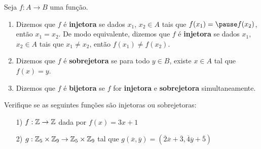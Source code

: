 \documentclass{beamer}
\begin{document}
    \begin{frame}
        \begin{definicao}
            Seja $f : A \to B$ uma fun\c{c}\~ao.\pause
            \begin{enumerate}[label={\roman*})]
                \item Dizemos que $f$ \'e \textbf{injetora} \pause se dados $x_1$, \pause $x_2 \in A$ \pause tais que $f(x_1) = \pause f(x_2)$, \pause ent\~ao $x_1 = x_2$. \pause De modo equivalente, \pause dizemos que $f$ \'e \textbf{injetora} \pause se dados $x_1$, \pause $x_2 \in A$ \pause tais que $x_1 \ne x_2$, \pause ent\~ao $f(x_1) \ne f(x_2)$.\pause

                \vspace{.3cm}

                \item Dizemos que $f$ \'e \textbf{sobrejetora} \pause se para todo $y \in B$, \pause existe $x \in A$ \pause tal que $f(x) = y$.\pause

                \vspace{.3cm}

                \item Dizemos que $f$ é \textbf{bijetora} \pause se $f$ for \textbf{injetora} \pause e \textbf{sobrejetora} \pause simultaneamente.\pause

                \vspace{.3cm}
            \end{enumerate}
        \end{definicao}
    \end{frame}

    \begin{frame}
        \begin{exemplos}
            Verifique se as seguintes fun\c{c}\~oes s\~ao injetoras \pause ou sobrejetoras:\pause
            \begin{enumerate}
                \item[1)] $f : \mathbb{Z} \to \mathbb{Z}$ dada por $f(x) = 3x + 1$
            \end{enumerate}
        \end{exemplos}

        \vspace{5cm}
    \end{frame}

    \begin{frame}
        \begin{exemplos}
            \begin{enumerate}
                \item[2)] $g : \mathbb{Z}_5 \times \mathbb{Z}_9 \to \mathbb{Z}_5 \times \mathbb{Z}_9$ tal que $g(\overline{x},\overline{y}) = (\overline{2} \overline{x} + \overline{3}, \overline{4}\overline{y} + \overline{5})$
            \end{enumerate}
        \end{exemplos}

        \vspace{5cm}
    \end{frame}
\end{document}
